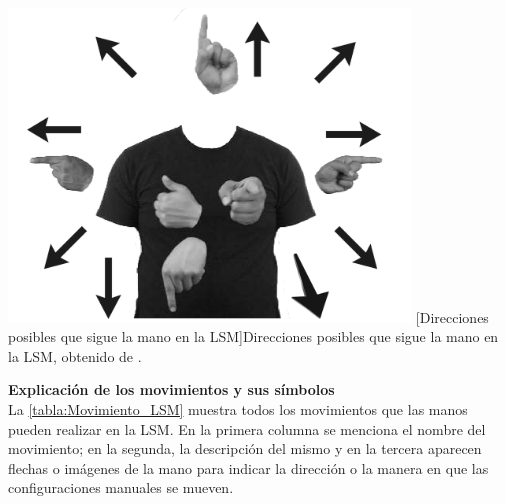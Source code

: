 \begin{center}
    \includegraphics[width=0.8\textwidth]{Images/Cap 2/Direccion_Manos_LSM.png}
    [Direcciones posibles que sigue la mano en la LSM]{Direcciones posibles que sigue la mano en la LSM, obtenido de \cite{ref37}.} 
    \label{direcciones_Mano}
\end{center}

\newpage
\textbf{Explicación de los movimientos y sus símbolos}\\
La \autoref{tabla:Movimiento_LSM} muestra todos los movimientos que las manos pueden realizar en la LSM. En la primera columna se menciona el nombre del movimiento; en la segunda, la descripción del mismo y en la tercera aparecen flechas o imágenes de la mano para indicar la dirección o la manera en que las configuraciones manuales se mueven.\\

